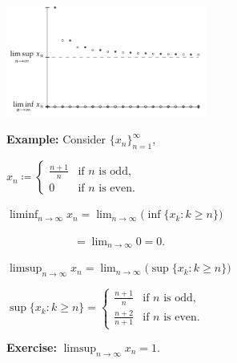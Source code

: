 \documentclass[10pt,aspectratio=149]{beamer}
\begin{document}
\begin{frame}

\hspace*{2.3in}\includegraphics[width=2.6in]{../figures/sequence-limsupliminf_an_bn-example}

\vspace*{-1.5in}

\textbf{Example:}
Consider $\{ x_n \}_{n=1}^\infty$,

\medskip

$\displaystyle
x_n \coloneqq
\begin{cases}
\frac{n+1}{n} & \text{if } n \text{ is odd,} \\
0             & \text{if } n \text{ is even.}
\end{cases}
$

\pause
\medskip

$\displaystyle
\liminf_{n\to\infty} x_n =
\lim_{n\to\infty}
\bigl(
\inf \{ x_k : k \geq n \}
\bigr)
$

\pause
\medskip

$\displaystyle
\qquad
\qquad
\qquad
=
\lim_{n\to\infty} 0 = 0$.

\pause
\medskip

$\displaystyle
\limsup_{n\to\infty} x_n =
\lim_{n\to\infty}
\bigl(
\sup \{ x_k : k \geq n \}
\bigr)$


\pause
\medskip

$\displaystyle
\sup \{ x_k : k \geq n \} =
\begin{cases}
\frac{n+1}{n}   & \text{if } n \text{ is odd,} \\
\frac{n+2}{n+1} & \text{if } n \text{ is even.}
\end{cases}$

\pause
\medskip

\textbf{Exercise:} $\displaystyle \limsup_{n\to\infty} x_n = 1$.

\end{frame}
\end{document}
